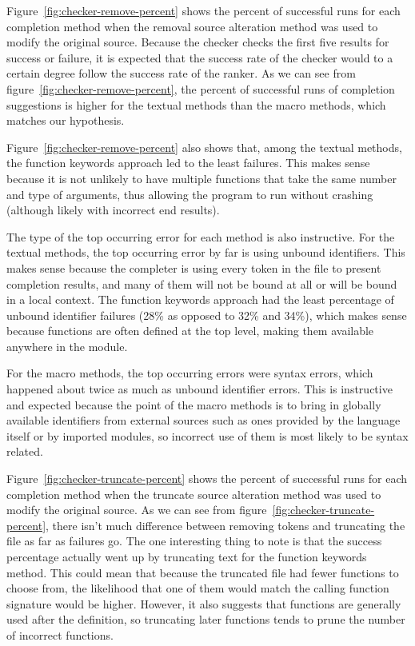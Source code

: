 \documentclass[ms,electronic,twosidetoc,letterpaper,chaptercenter,parttop,lol,lof,lot]{byumsphd}
\begin{document}
Figure~\ref{fig:checker-remove-percent} shows the percent of successful runs for each completion method when the removal source alteration method was used to modify the original source.
Because the checker checks the first five results for success or failure, it is expected that the success rate of the checker would to a certain degree follow the success rate of the ranker.
As we can see from figure~\ref{fig:checker-remove-percent}, the percent of successful runs of completion suggestions is higher for the textual methods than the macro methods, which matches our hypothesis.

Figure~\ref{fig:checker-remove-percent} also shows that, among the textual methods, the function keywords approach led to the least failures.
This makes sense because it is not unlikely to have multiple functions that take the same number and type of arguments, thus allowing the program to run without crashing (although likely with incorrect end results).

The type of the top occurring error for each method is also instructive.
For the textual methods, the top occurring error by far is using unbound identifiers.
This makes sense because the completer is using every token in the file to present completion results, and many of them will not be bound at all or will be bound in a local context.
The function keywords approach had the least percentage of unbound identifier failures (28\% as opposed to 32\% and 34\%), which makes sense because functions are often defined at the top level, making them available anywhere in the module.

For the macro methods, the top occurring errors were syntax errors, which happened about twice as much as unbound identifier errors.
This is instructive and expected because the point of the macro methods is to bring in globally available identifiers from external sources such as ones provided by the language itself or by imported modules, so incorrect use of them is most likely to be syntax related.

Figure~\ref{fig:checker-truncate-percent} shows the percent of successful runs for each completion method when the truncate source alteration method was used to modify the original source.
As we can see from figure~\ref{fig:checker-truncate-percent}, there isn't much difference between removing tokens and truncating the file as far as failures go.
The one interesting thing to note is that the success percentage actually went up by truncating text for the function keywords method.
This could mean that because the truncated file had fewer functions to choose from, the likelihood that one of them would match the calling function signature would be higher.
However, it also suggests that functions are generally used after the definition, so truncating later functions tends to prune the number of incorrect functions.
\end{document}
